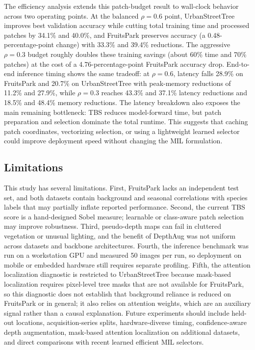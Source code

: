 \documentclass{ieeeaccess}
\begin{document}
The efficiency analysis extends this patch-budget result to wall-clock behavior across two operating
points. At the balanced $\rho=0.6$ point, UrbanStreetTree improves best validation accuracy while
cutting total training time and processed patches by 34.1\% and 40.0\%, and FruitsPark preserves
accuracy (a 0.48-percentage-point change) with 33.3\% and 39.4\% reductions. The aggressive
$\rho=0.3$ budget roughly doubles these training savings (about 60\% time and 70\% patches) at the
cost of a 4.76-percentage-point FruitsPark accuracy drop. End-to-end inference timing shows the same
tradeoff: at $\rho=0.6$, latency falls 28.9\% on FruitsPark and 20.7\% on UrbanStreetTree with
peak-memory reductions of 11.2\% and 27.9\%, while $\rho=0.3$ reaches 43.3\% and 37.1\% latency
reductions and 18.5\% and 48.4\% memory reductions. The latency breakdown also exposes the main
remaining bottleneck: TBS reduces model-forward time, but patch preparation and selection dominate
the total runtime. This suggests that caching patch coordinates, vectorizing selection, or using a
lightweight learned selector could improve deployment speed without changing the MIL formulation.

\subsection{Limitations}
This study has several limitations. First, FruitsPark lacks an independent test set, and both
datasets contain background and seasonal correlations with species labels that may partially inflate
reported performance. Second, the current TBS score is a hand-designed Sobel measure; learnable or
class-aware patch selection may improve robustness. Third, pseudo-depth maps can fail in cluttered
vegetation or unusual lighting, and the benefit of DepthAug was not uniform across datasets and
backbone architectures. Fourth, the inference benchmark was run on a workstation GPU and
measured 50 images per run, so deployment on mobile or embedded hardware still requires separate
profiling. Fifth, the attention localization diagnostic is restricted to UrbanStreetTree because
mask-based localization requires pixel-level tree masks that are not available for FruitsPark, so
this diagnostic does not establish that background reliance is reduced on FruitsPark or in general;
it also relies on attention weights, which are an auxiliary signal rather than a causal explanation.
Future experiments should include held-out locations, acquisition-series splits, hardware-diverse
timing, confidence-aware depth augmentation, mask-based attention localization on additional
datasets, and direct comparisons with recent learned efficient MIL selectors.
\end{document}

